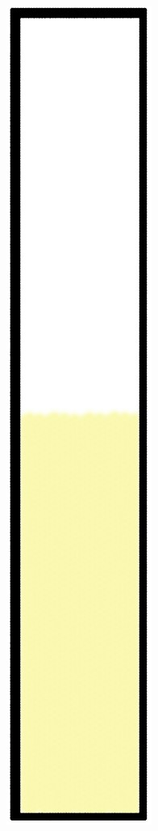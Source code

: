 \begin{figure}[h]
  \centering
  \begin{subfigure}[t]{0.09\textwidth}
    \includegraphics[width=\textwidth]{images/oscillate/000.jpg}

\end{subfigure}
\end{figure}

